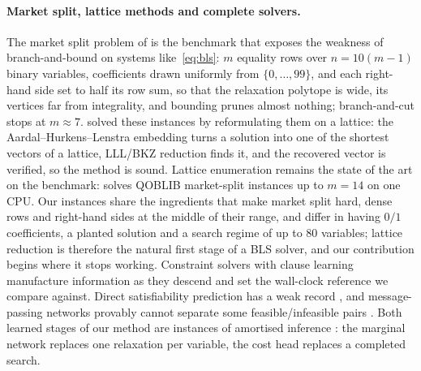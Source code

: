 \documentclass[final,5p,times,twocolumn,authoryear]{elsarticle}
\begin{document}
\paragraph{Market split, lattice methods and complete solvers.} The market split problem of \citet{cornuejols1999class} is the benchmark that exposes the weakness of branch-and-bound on systems like~\eqref{eq:bls}: $m$ equality rows over $n=10(m-1)$ binary variables, coefficients drawn uniformly from $\{0,\dots,99\}$, and each right-hand side set to half its row sum, so that the relaxation polytope is wide, its vertices far from integrality, and bounding prunes almost nothing; branch-and-cut stops at $m\approx7$. \citet{aardal2000diophantine,aardal2000market} solved these instances by reformulating them on a lattice: the Aardal--Hurkens--Lenstra embedding turns a solution into one of the shortest vectors of a lattice, LLL/BKZ reduction \citep{lenstra1982factoring,schnorr1994lattice} finds it, and the recovered vector is verified, so the method is sound. Lattice enumeration remains the state of the art on the benchmark: \citet{wassermann2025solving} solves QOBLIB market-split instances up to $m=14$ on one CPU. Our instances share the ingredients that make market split hard, dense rows and right-hand sides at the middle of their range, and differ in having $0/1$ coefficients, a planted solution and a search regime of up to $80$ variables; lattice reduction is therefore the natural first stage of a BLS solver, and our contribution begins where it stops working. Constraint solvers with clause learning \citep{marquessilva1999grasp,ohrimenko2009propagation} manufacture information as they descend and set the wall-clock reference we compare against. Direct satisfiability prediction has a weak record \citep{selsam2019neurosat,li2023g4satbench}, and message-passing networks provably cannot separate some feasible/infeasible pairs \citep{chen2023representing}. Both learned stages of our method are instances of amortised inference \citep{amos2023tutorial,gershman2014amortized}: the marginal network replaces one relaxation per variable, the cost head replaces a completed search.
\end{document}
